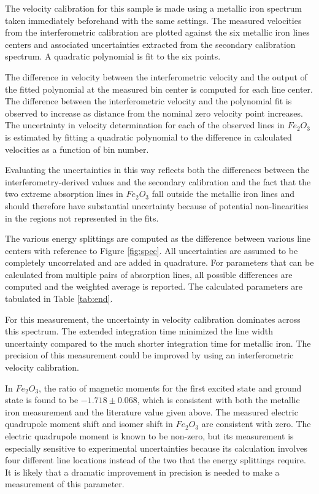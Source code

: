 The velocity calibration for this sample is made using a metallic iron spectrum taken immediately beforehand with the same settings. The measured velocities from the interferometric calibration are plotted against the six metallic iron lines centers and associated uncertainties extracted from the secondary calibration spectrum. A quadratic polynomial is fit to the six points. 

The difference in velocity between the interferometric velocity and the output of the fitted polynomial at the measured bin center is computed for each line center. The difference between the interferometric velocity and the polynomial fit is observed to increase as distance from the nominal zero velocity point increases. The uncertainty in velocity determination for each of the observed lines in $Fe_2O_3$ is estimated by fitting a quadratic polynomial to the difference in calculated velocities as a function of bin number. 

Evaluating the uncertainties in this way reflects both the differences between the interferometry-derived values and the secondary calibration and the fact that the two extreme absorption lines in $Fe_2O_3$ fall outside the metallic iron lines and should therefore have substantial uncertainty because of potential non-linearities in the regions not represented in the fits. 

The various energy splittings are computed as the difference between various line centers with reference to Figure \ref{fig:spec}.  All uncertainties are assumed to be completely uncorrelated and are added in quadrature. For parameters that can be calculated from multiple pairs of absorption lines, all possible differences are computed and the weighted average is reported. The calculated parameters are tabulated in Table \ref{tab:end}.

For this measurement, the uncertainty in velocity calibration dominates across this spectrum. The extended integration time minimized the line width uncertainty compared to the much shorter integration time for metallic iron. The precision of this measurement could be improved by using an interferometric velocity calibration. 

In $Fe_2O_3$, the ratio of magnetic moments for the first excited state and ground state is found to be $-1.718\pm0.068$, which is consistent with both the metallic iron measurement and the literature value given above. The measured electric quadrupole moment shift and isomer shift in $Fe_2 O_3$ are consistent with zero. The electric quadrupole moment is known to be non-zero, but its measurement is especially sensitive to experimental uncertainties because its calculation involves four different line locations instead of the two that the energy splittings require. It is likely that a dramatic improvement in precision is needed to make a measurement of this parameter. 

